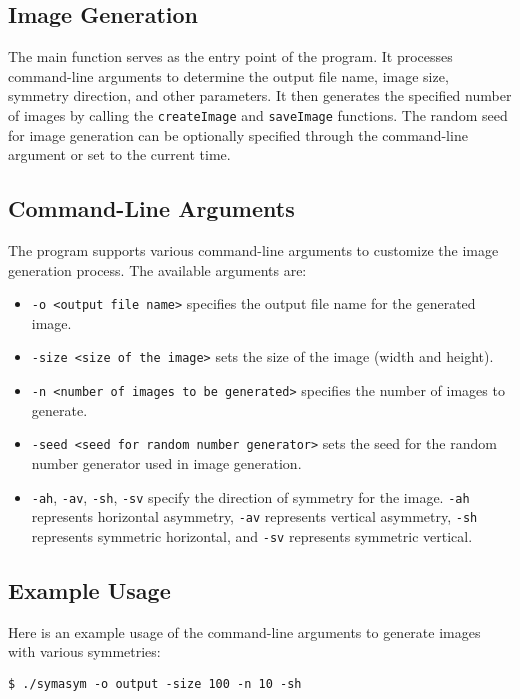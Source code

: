 \documentclass{report}
\begin{document}
\subsection{Image Generation}
The main function serves as the entry point of the program. It processes command-line arguments to determine the output file name, image size, symmetry direction, and other parameters. It then generates the specified number of images by calling the \texttt{createImage} and \texttt{saveImage} functions. The random seed for image generation can be optionally specified through the command-line argument or set to the current time.

\subsection{Command-Line Arguments}
The program supports various command-line arguments to customize the image generation process. The available arguments are:

\begin{itemize}
  \item \texttt{-o <output file name>} specifies the output file name for the generated image.
  \item \texttt{-size <size of the image>} sets the size of the image (width and height).
  \item \texttt{-n <number of images to be generated>} specifies the number of images to generate.
  \item \texttt{-seed <seed for random number generator>} sets the seed for the random number generator used in image generation.
  \item \texttt{-ah}, \texttt{-av}, \texttt{-sh}, \texttt{-sv} specify the direction of symmetry for the image. \texttt{-ah} represents horizontal asymmetry, \texttt{-av} represents vertical asymmetry, \texttt{-sh} represents symmetric horizontal, and \texttt{-sv} represents symmetric vertical.

\end{itemize}

\subsection{Example Usage}
Here is an example usage of the command-line arguments to generate images with various symmetries:

\begin{verbatim}
$ ./symasym -o output -size 100 -n 10 -sh 
\end{verbatim}
\end{document}
